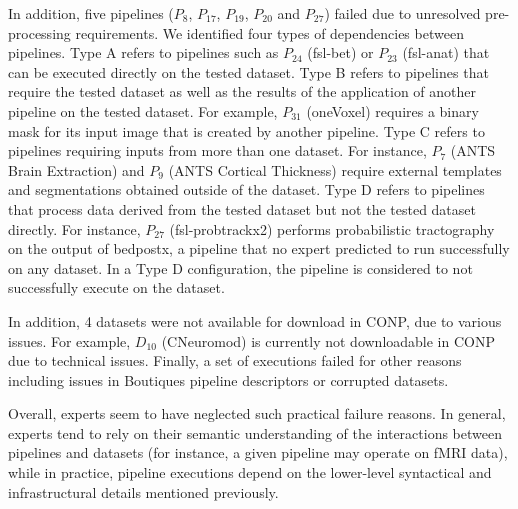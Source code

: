 \documentclass[conference]{IEEEtran}
\begin{document}
In addition, five pipelines ($P_{8}$, $P_{17}$, $P_{19}$, $P_{20}$ and
$P_{27}$) failed due to unresolved pre-processing requirements. We
identified four types of dependencies between pipelines. Type A refers to pipelines such
as $P_{24}$ (fsl-bet) or $P_{23}$ (fsl-anat) that can be executed directly
on the tested dataset. Type B refers to pipelines that require the tested
dataset as well as the results of the application of another pipeline on
the tested dataset. For example, $P_{31}$ (oneVoxel) requires a binary mask
for its input image that is created by another pipeline. Type C refers
to pipelines requiring inputs from more than one dataset. For instance, $P_7$
(ANTS Brain Extraction) and $P_9$ (ANTS Cortical Thickness) require
external templates and segmentations obtained outside of the dataset. Type
D refers to pipelines that process data derived from the tested dataset but not
the tested dataset directly.  For instance, $P_{27}$ (fsl-probtrackx2) performs
probabilistic tractography on the output of bedpostx, a pipeline that
no expert predicted to run successfully on any dataset. In a Type D
configuration, the pipeline is considered to not successfully execute on
the dataset. 

In addition, 4 datasets were not available for download in CONP, due to
various issues. For example, $D_{10}$ (CNeuromod) is currently not
downloadable in CONP due to technical issues.
Finally, a set of executions failed for other reasons including issues in
Boutiques pipeline descriptors or corrupted datasets.


Overall, experts seem to have neglected such practical failure reasons. In
general, experts tend to rely on their semantic understanding of the
interactions between pipelines and datasets (for instance, a given pipeline
may operate on fMRI data), while in practice, pipeline executions depend on
the lower-level syntactical and infrastructural details mentioned previously.

\end{document}
